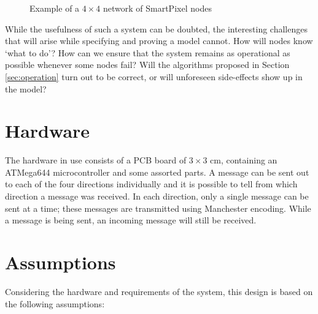 \begin{figure}[h]
\centering
\begin{nodefigure}
\end{nodefigure}
\caption{\label{fig:examplenet} Example of a $4 \times 4$ network of SmartPixel nodes}
\end{figure}

While the usefulness of such a system can be doubted, the interesting challenges that will arise while specifying and proving a model cannot. How will nodes know `what to do'? How can we ensure that the system remains as operational as possible whenever some nodes fail? Will the algorithms proposed in Section \ref{sec:operation} turn out to be correct, or will unforeseen side-effects show up in the model? 

\section{Hardware}
\label{sec:hardware}

The hardware in use consists of a PCB board of $3 \times 3$ cm, containing an ATMega644 microcontroller and some assorted parts. A message can be sent out to each of the four directions individually and it is possible to tell from which direction a message was received. In each direction, only a single message can be sent at a time; these messages are transmitted using Manchester encoding. While a message is being sent, an incoming message will still be received.

\section{Assumptions}
\label{sec:assumptions}

Considering the hardware and requirements of the system, this design is based on the following assumptions:


